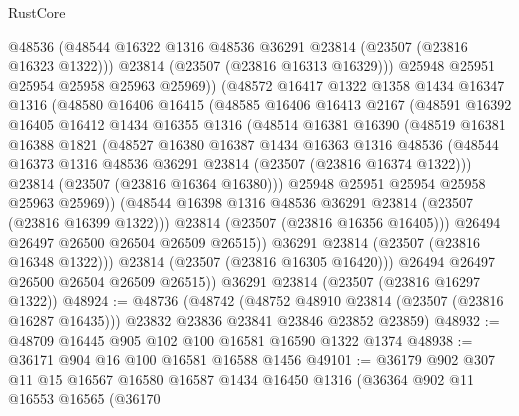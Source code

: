 \begin{lexlean}{RustCore}
\begin{coremodule}
                @48536
                (@48544 @16322 @1316 @48536 @36291 @23814 (@23507 (@23816 @16323 @1322)))
                @23814
                (@23507 (@23816 @16313 @16329)))
              @25948
              @25951
              @25954
              @25958
              @25963
              @25969))
          (@48572
            @16417
            @1322
            @1358
            @1434
            @16347
            @1316
            (@48580
              @16406
              @16415
              (@48585
                @16406
                @16413
                @2167
                (@48591
                  @16392
                  @16405
                  @16412
                  @1434
                  @16355
                  @1316
                  (@48514
                    @16381
                    @16390
                    (@48519
                      @16381
                      @16388
                      @1821
                      (@48527
                        @16380
                        @16387
                        @1434
                        @16363
                        @1316
                        @48536
                        (@48544 @16373 @1316 @48536 @36291 @23814 (@23507 (@23816 @16374 @1322)))
                        @23814
                        (@23507 (@23816 @16364 @16380)))
                      @25948
                      @25951
                      @25954
                      @25958
                      @25963
                      @25969))
                  (@48544 @16398 @1316 @48536 @36291 @23814 (@23507 (@23816 @16399 @1322)))
                  @23814
                  (@23507 (@23816 @16356 @16405)))
                @26494
                @26497
                @26500
                @26504
                @26509
                @26515))
            @36291
            @23814
            (@23507 (@23816 @16348 @1322)))
          @23814
          (@23507 (@23816 @16305 @16420)))
        @26494
        @26497
        @26500
        @26504
        @26509
        @26515))
    @36291
    @23814
    (@23507 (@23816 @16297 @1322))
@48924 := @48736
    (@48742
      (@48752 @48910 @23814 (@23507 (@23816 @16287 @16435)))
      @23832
      @23836
      @23841
      @23846
      @23852
      @23859)
@48932 := @48709 @16445 @905 @102 @100 @16581 @16590 @1322 @1374
@48938 := @36171 @904 @16 @100 @16581 @16588 @1456
@49101 := @36179
    @902
    @307
    @11
    @15
    @16567
    @16580
    @16587
    @1434
    @16450
    @1316
    (@36364
      @902
      @11
      @16553
      @16565
      (@36170

\end{coremodule}
\end{lexlean}
